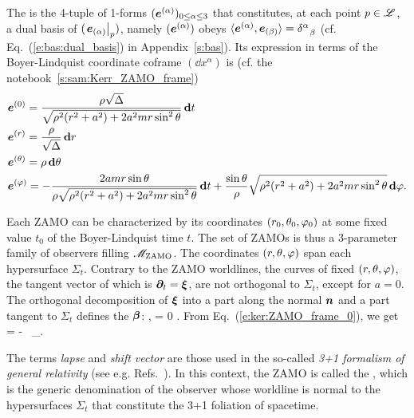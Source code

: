 The  is the 4-tuple of 1-forms
$(\bm{e}^{(\alpha)})_{0\leq \alpha\leq 3}$ that constitutes, at each point $p\in\mathscr{L}$, a dual basis of
$(\left. \bm{e}_{(\alpha)}\right| _p)$, namely $(\bm{e}^{(\alpha)})$ obeys
$\langle \bm{e}^{(\alpha)} , \bm{e}_{(\beta)} \rangle = \delta^\alpha_{\ \ \beta} $
(cf. Eq.~(\ref{e:bas:dual_basis}) in Appendix~\ref{s:bas}). Its expression in terms of the
Boyer-Lindquist coordinate coframe $(\dd x^\alpha)$ is (cf. the notebook~\ref{s:sam:Kerr_ZAMO_frame})
\begin{subequations}
\label{e:ker:def_ZAMO_coframe}
\begin{align}
  & \bm{e}^{(0)} =
  \frac{\rho\sqrt{\Delta}}{\sqrt{\rho^2(r^2 + a^2) + 2 a^2 m r \sin^2\theta}}\, \mathbf{d} t \\
  & \bm{e}^{(r)} = \frac{\rho}{\sqrt{\Delta}} \, \mathbf{d} r \\
  & \bm{e}^{(\theta)} = \rho\, \mathbf{d} \theta  \\
  & \bm{e}^{(\varphi)} = - \frac{2 a m r \sin\theta}{\rho\sqrt{\rho^2(r^2 + a^2) + 2 a^2 m r \sin^2\theta}} \, \mathbf{d} t
  + \frac{\sin\theta}{\rho} \sqrt{\rho^2(r^2 + a^2) + 2 a^2 m r \sin^2\theta} \, \mathbf{d}\varphi .
\end{align}
\end{subequations}


Each ZAMO can be characterized by its coordinates $(r_0,\theta_0,\varphi_0)$ at some fixed
value $t_0$ of the Boyer-Lindquist time $t$. The set of ZAMOs is thus a 3-parameter family of observers
filling $\mathscr{M}_{\rm ZAMO}$.
The coordinates $(r,\theta,\varphi)$ span each hypersurface $\Sigma_t$.
Contrary to the ZAMO worldlines, the curves of fixed $(r,\theta, \varphi)$, the tangent vector
of which is $\bm{\partial}_t = \bm{\xi}$, are not orthogonal to $\Sigma_t$, except for $a=0$. The orthogonal
decomposition of $\bm{\xi}$ into a part along the normal $\bm{n}$ and a part tangent to $\Sigma_t$
defines the  $\bm{\beta}$:
\be \label{e:ker:xi_3p1_ZAMO}
    , \qquad {}\cdot\w{\beta} = 0 .
\ee
From Eq.~(\ref{e:ker:ZAMO_frame_0}), we get
\be
    \w{\beta} = - \, \wpar_\ph .
\ee
\begin{remark}
The terms \emph{lapse} and \emph{shift vector} are those used in the so-called \emph{3+1 formalism
of general relativity}
(see e.g. Refs.~\cite{Alcub08,BaumgS10,Gourg12,Shiba16}). In this context, the ZAMO is called the
,
which is the generic denomination of the observer whose worldline is normal to
the hypersurfaces $\Sigma_t$ that constitute the 3+1 foliation of spacetime.
\end{remark}

